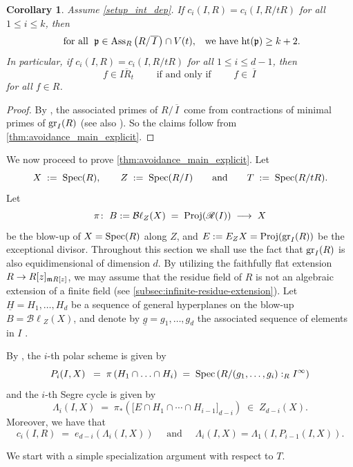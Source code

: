 \documentclass[a4paper, 11pt]{amsart}
\newcommand{\Bl}{{\mathcal{B}\ell}}
\newcommand{\mm}{{\normalfont\mathfrak{m}}}
\newcommand{\pp}{{\normalfont\mathfrak{p}}}
\newcommand{\HT}{\normalfont\text{ht}}
\newcommand{\Ass}{{\normalfont\text{Ass}}}
\newcommand{\Rees}{\mathscr{R}}
\newcommand{\gr}{{\normalfont\text{gr}}}
\newcommand{\Proj}{\normalfont\text{Proj}}
\newcommand{\Spec}{\normalfont\text{Spec}}
\newtheorem{corollary}[corollary]{Corollary}
\theoremstyle{definition}
\begin{document}
	\begin{corollary}\label{cor_PSID}
		Assume \autoref{setup_int_dep}.
		If $c_i(I, R)=c_i(I, R/tR)$ for all $1 \le i \le k$, then 
		$$
		\text{ for all \;$\pp \in \Ass_R\left(R/\overline{\,I\,}\right) \cap V(t),$\quad  we have $\HT(\pp)\ge k+2$.} 
		$$
		In particular, if $c_i(I, R)=c_i(I, R/tR)$ for all $1 \le i \le d-1$, then 
		$$
		f \in \overline{IR_t} \qquad 
		\text{ if and only if } \qquad f \in \overline{\,I\,}
		$$
		for all $f \in R$.
	\end{corollary}
	\begin{proof}
		By \cite[3.9 and 4.1]{MCADAM}, the associated primes of $R/\overline{\,I\,}$ come from contractions of minimal primes of $\gr_I(R)$ (see also \cite[\S9.6]{LAZ_POS_II}).
		So the claims follow from \autoref{thm:avoidance_main_explicit}.
	\end{proof}
	
	We now proceed to prove \autoref{thm:avoidance_main_explicit}.
	Let
	$$
	X \;:=\; \Spec(R),\qquad Z \;:=\; \Spec(R/I) \qquad \text{and} \qquad T \;:=\; \Spec(R/tR).
	$$
	Let
	$$
	\pi \colon \; B:=\Bl_Z(X) \;=\; \Proj(\Rees(I)) \;\longrightarrow\; X
	$$
	be the blow-up of $X=\Spec(R)$ along $Z$, and $E := E_ZX = \Proj(\gr_I(R))$ be the exceptional divisor. 	
	Throughout this section we shall use the fact that $\gr_I(R)$ is also equidimensional of dimension $d$.
	By utilizing the faithfully flat extension $R \rightarrow R[z]_{\mm R[z]}$, we may assume that the residue field of $R$ is not an algebraic extension of a finite field (see \autoref{subsec:infinite-residue-extension}).
	Let $\underline{H} = H_1,\ldots, H_d$ be a sequence of general hyperplanes on the blow-up $B=\Bl_Z(X)$, and denote by $\underline{g}=g_1,\ldots,g_d$ the associated sequence of elements in $I$ .
	
	
	By \cite[Theorem C]{CRPU}, the $i$-th polar scheme is given by 
	$$
	P_i(I, X) \; \;=\; \pi\left(H_1 \cap \ldots \cap H_i\right) \;=\; \Spec\left(R/(g_1,\ldots,g_i):_RI^\infty\right)
	$$
	and the $i$-th Segre cycle is given by
	$$
	\Lambda_i(I, X)  \;=\;  \pi_*\left(\big[E \cap H_1 \cap \cdots \cap H_{i-1}\big]_{d-i}\right) \;\in\; Z_{d-i}(X). 
	$$
	Moreover, we have that 
	$$
	c_i(I, R) \;=\; e_{d-i}\left(\Lambda_i(I, X)\right) \quad \text{ and } \quad \Lambda_i(I, X) = \Lambda_1\left(I, P_{i-1}(I, X)\right).
	$$
	
	We start with a simple specialization argument with respect to $T$.
	
\end{document}
